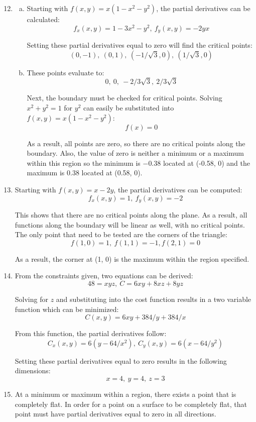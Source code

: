 \documentclass{article}
\begin{document}
\begin{enumerate}[1.]
  \setcounter{enumi}{11}
  \item \begin{enumerate}[a.]
      \item Starting with $f(x,y) = x(1-x^{2}-y^{2})$, the partial derivatives can
        be calculated:
        $$ f_{x}(x,y) = 1 - 3x^{2} -y^{2}, \ f_{y}(x,y) = -2yx $$

        Setting these partial derivatives equal to zero will find the critical
        points:
        $$ (0, -1),\ (0, 1),\ (-1/\sqrt{3}, 0),\ (1/\sqrt{3}, 0) $$
      \item These points evaluate to:
        $$ 0,\ 0,\ -2/3\sqrt{3},\ 2/3\sqrt{3} $$

        Next, the boundary must be checked for critical points. Solving $x^{2} +
        y^{2} = 1$ for $y^{2}$ can easily be substituted into $f(x,y) = x(1-x^{2}
        - y^{2})$:
        $$ f(x) = 0 $$

        As a result, all points are zero, so there are no critical points along
        the boundary. Also, the value of zero is neither a minimum or a maximum
        within this region so the minimum is $-0.38$ located at (-0.58, 0) and the
        maximum is $0.38$ located at (0.58, 0).

    \end{enumerate}

  \item Starting with $f(x,y) = x -2y$, the partial derivatives can be computed:
    $$ f_{x}(x,y) = 1, \ f_{y}(x,y) = -2 $$

    This shows that there are no critical points along the plane. As a result,
    all functions along the boundary will be linear as well, with no critical
    points. The only point that need to be tested are the corners of the
    triangle:
    $$ f(1, 0) = 1, \ f(1,1) = -1, f(2,1) = 0 $$

    As a result, the corner at (1, 0) is the maximum within the region
    specified.

  \item From the constraints given, two equations can be derived:
    $$ 48 = xyz, \ C = 6xy + 8xz + 8yz $$

    Solving for $z$ and substituting into the cost function results in a two
    variable function which can be minimized:
    $$ C(x, y) = 6xy + 384/y + 384/x $$

    From this function, the partial derivatives follow:
    $$ C_{x}(x,y) = 6(y - 64/x^{2}), \ C_{y}(x,y) = 6(x - 64/y^{2}) $$

    Setting these partial derivatives equal to zero results in the following
    dimensions:
    $$ x = 4, \ y = 4, \ z = 3 $$

  \item At a minimum or maximum within a region, there exists a point that is
    completely flat. In order for a point on a surface to be completely flat,
    that point must have partial derivatives equal to zero in all directions.

\end{enumerate}
\end{document}
